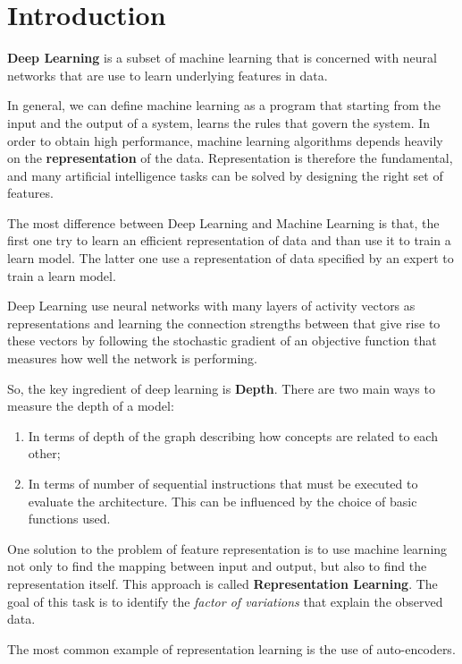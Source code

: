 \chapter*{Introduction}
\textbf{Deep Learning} is a subset of machine learning that is concerned with 
neural networks that are use to learn underlying features in data.

In general, we can define machine learning as a program that starting from the 
input and the output of a system, learns the rules that govern the system. In 
order to obtain high performance, machine learning algorithms depends heavily on 
the \textbf{representation} of the data. Representation is therefore the fundamental, 
and many artificial intelligence tasks can be solved by designing the right set of features.

The most difference between Deep Learning and Machine Learning is that, 
the first one try to learn an efficient representation of data and than use it 
to train a learn model. The latter one use a representation of data specified by 
an expert to train a learn model.

Deep Learning use neural networks with many layers of activity vectors as 
representations and learning the connection strengths between that give rise to 
these vectors by following the stochastic gradient of an objective function that
measures how well the network is performing.

So, the key ingredient of deep learning is \textbf{Depth}. There are two main 
ways to measure the depth of a model:
\begin{enumerate}
    \item In terms of depth of the graph describing how concepts are related to
        each other;
    \item In terms of number of sequential instructions that must be executed to 
        evaluate the architecture. This can be influenced by the choice of basic 
        functions used.
\end{enumerate}

One solution to the problem of feature representation is to use machine learning
not only to find the mapping between input and output, but also to find the
representation itself. This approach is called \textbf{Representation Learning}.
The goal of this task is to identify the \textit{factor of variations} that 
explain the observed data.

\begin{note}
    The most common example of representation learning is the use of auto-encoders.
\end{note}

